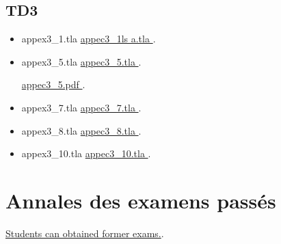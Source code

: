 \documentclass[ 12pt]{article}
\begin{document}
\begin{tcolorbox}
  
\subsection{TD3}
    
\begin{itemize}

  \item[]   appex3\_1.tla 
    \href{http://mery54.github.io/teaching/mvsi/models/appex3_1.tla}{
      appec3\_1ls a.tla }.

    
  \item[]   appex3\_5.tla 
    \href{http://mery54.github.io/teaching/mvsi/models/appex3_5.tla}{
      appec3\_5.tla }.

       \href{http://mery54.github.io/teaching/mvsi/models/appex3_5.pdf}{
      appec3\_5.pdf }.

      \item[]   appex3\_7.tla 
        \href{http://mery54.github.io/teaching/mvsi/models/appex3_7.tla}{
          appec3\_7.tla }.

              \item[]   appex3\_8.tla 
        \href{http://mery54.github.io/teaching/mvsi/models/appex3_8.tla}{
          appec3\_8.tla }.

              \item[]   appex3\_10.tla 
        \href{http://mery54.github.io/teaching/mvsi/models/appex3_10.tla}{
          appec3\_10.tla }.
        
   \end{itemize}


\section{Annales   des examens passés}

\href{http://mery54.github.io/teaching/mvsi/lecturesnotes/mvsi-annales.pdf}{Students
  can obtained former  exams.}.
        
   



\end{tcolorbox}
\end{document}
